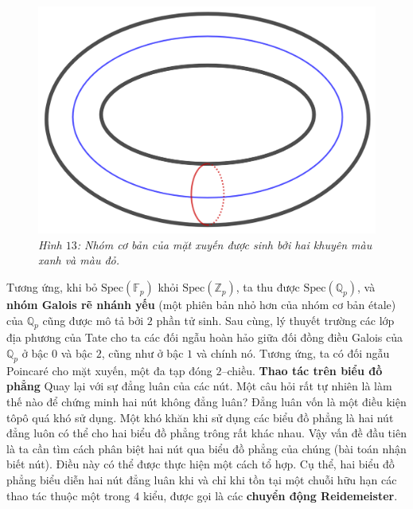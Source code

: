 \begin{multicols}{2}
	\begin{figure}[H]
		\vspace*{-5pt}
		\centering
		\captionsetup{labelformat= empty, justification=centering}
		\includegraphics[width= 0.75\linewidth]{h13}
		\caption{\small\textit{\color{duongvaotoanhoc}Hình $13$: Nhóm cơ bản của mặt xuyến được sinh bởi hai khuyên màu xanh và màu đỏ.}}
		\vspace*{-5pt}
	\end{figure}
	Tương ứng, khi bỏ $\text{Spec}(\mathbb{F}_p)$ khỏi $\text{Spec}(\mathbb{Z}_p)$, ta thu được $\text{Spec}(\mathbb{Q}_p)$, và {\bf\color{duongvaotoanhoc} nhóm Galois rẽ nhánh yếu} (một phiên bản nhỏ hơn của nhóm cơ bản étale) của $\mathbb{Q}_p$ cũng được mô tả bởi $2$ phần tử sinh. Sau cùng, lý thuyết trường các lớp địa phương của Tate cho ta các đối ngẫu hoàn hảo giữa đối đồng điều Galois của  $\mathbb{Q}_p$ ở bậc $0$ và bậc $2$, cũng như ở bậc $1$ và chính nó. Tương ứng, ta có đối ngẫu Poincaré cho mặt xuyến, một đa tạp đóng $2$--chiều.
	\vskip 0.1cm
	\textbf{\color{duongvaotoanhoc}Thao tác trên biểu đồ phẳng}
	\vskip 0.1cm
	Quay lại với sự đẳng luân của các nút. Một câu hỏi rất tự nhiên là làm thế nào để chứng minh hai nút không đẳng luân? Đẳng luân vốn là một điều kiện tôpô quá khó sử dụng. Một khó khăn khi sử dụng các biểu đồ phẳng là hai nút đẳng luôn có thể cho hai biểu đồ phẳng trông rất khác nhau. Vậy vấn đề đầu tiên là ta cần tìm cách phân biệt hai nút qua biểu đồ phẳng của chúng (bài toán nhận biết nút). Điều này có thể được thực hiện một cách tổ hợp. Cụ thể, hai biểu đồ phẳng biểu diễn hai nút đẳng luân khi và chỉ khi tồn tại một chuỗi hữu hạn các thao tác thuộc một trong $4$ kiểu, được gọi là các {\bf\color{duongvaotoanhoc} chuyển động Reidemeister}.
	\begin{figure}[H]
		\vspace*{-5pt}
		\centering
		\captionsetup{labelformat= empty, justification=centering}

\end{figure}
\end{multicols}
